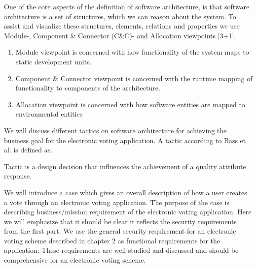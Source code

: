 \noindent
One of the core aspects of the definition of software architecture, is that software architecture is a set of structures, which we can reason about the system. To assist and visualize these structures, elements, relations and properties we use Module-, Component \& Connector (C\&C)- and Allocation viewpoints [3+1]. 

\begin{enumerate}
    \item Module viewpoint is concerned with how functionality of the system maps to static development units.
    \item Component \& Connector viewpoint is concerned with the runtime mapping of functionality to components of the architecture.
    \item Allocation viewpoint is concerned with how software entities are mapped to environmental entities
\end{enumerate}

\noindent
We will discuss different tactics on software architecture for achieving the business goal for the electronic voting application. A tactic according to Bass et al. is defined as.

\begin{defi}
Tactic is a design decision that influences the achievement of a quality attribute response. \cite{Bass}
\end{defi}

\noindent
We will introduce a case which gives an overall description of how a user creates a vote through an electronic voting application. The purpose of the case is describing business/mission requirement of the electronic voting application. Here we will emphasize that it should be clear it reflects the security requirements from the first part. We use the general security requirement for an electronic voting scheme described in chapter 2 as functional requirements for the application. These requirements are well studied and discussed and should be comprehensive for an electronic voting scheme.